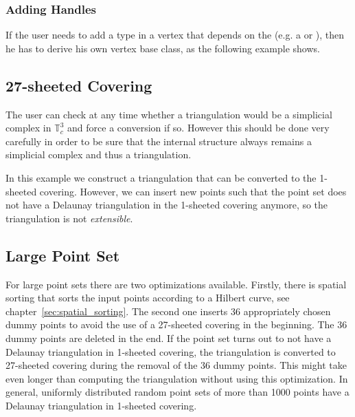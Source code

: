 
\subsubsection{Adding Handles}
If the user needs to add a type in a vertex that depends on the
 (e.g. a  or
), then he has to derive his own vertex base class,
as the following example shows.


\subsection{27-sheeted Covering}
The user can check at any time whether a triangulation would be a
simplicial complex in $\mathbb T_c^3$ and force a conversion if
so. However this should be done very carefully in order to be sure
that the internal structure always remains a simplicial complex and
thus a triangulation.

In this example we construct a triangulation that can be converted to
the 1-sheeted covering. However, we can insert new points such that the
point set does not have a Delaunay triangulation in the 1-sheeted
covering anymore, so the triangulation is not \emph{extensible}.



\subsection{Large Point Set}

For large point sets there are two optimizations available. Firstly,
there is spatial sorting that sorts the input points according to a
Hilbert curve, see chapter~\ref{sec:spatial_sorting}.
The second one inserts 36 appropriately chosen dummy points to avoid
the use of a 27-sheeted covering in the beginning. The 36 dummy
points are deleted in the end. If the point set turns out to not have
a Delaunay triangulation in 1-sheeted covering, the triangulation is
converted to 27-sheeted covering during the removal of the 36 dummy
points. This might take even longer than computing the triangulation
without using this optimization. In general, uniformly distributed
random point sets of more than 1000 points have a Delaunay
triangulation in 1-sheeted covering.

